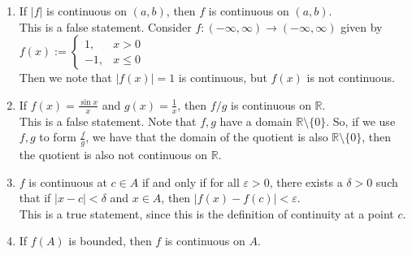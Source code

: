 \documentclass[12pt,letterpaper]{article}
\newcommand{\R}{\mathbb{R}}
\theoremstyle{case}
\theoremstyle{definition}
\newtheorem*{theorem*}{Theorem}
\begin{document}
\begin{enumerate}
\begin{enumerate}
\begin{theorem*}
\begin{enumerate}
						\item If $h:A \rightarrow \R$ is continuous at $c \in A$ and if $h(x) \neq 0$ for all $x \in A$, then the quotient $f/h$ is continuous at $c$.
					\end{enumerate}
				\end{theorem*}
			
				Thus, if we let $g=(f+g)-f$, we have that $g$ is also continuous by \textit{Theorem 5.2.1}.\\
				\item If $|f|$ is continuous on $(a,b)$, then $f$ is continuous on $(a,b)$.\\
				
				This is a false statement. Consider $f:(-\infty, \infty) \to (-\infty, \infty)$ given by $f(x):=\begin{cases}
					1, & x > 0 \\
					-1, & x \leq 0
				\end{cases}$\\
				Then we note that $|f(x)|=1$ is continuous, but $f(x)$ is not continuous.\\ 
				\item If $f(x)=\frac{\sin x}{x}$ and $g(x)=\frac{1}{x}$, then $f/g$ is continuous on $\R$.\\
				
				This is a false statement. Note that $f,g$ have a domain $\R \setminus \{0\}$. So, if we use $f,g$ to form $\frac{f}{g}$, we have that the domain of the quotient is also $\R \setminus \{0\}$, then the quotient is also not continuous on $\R$.\\
				\item $f$ is continuous at $c \in A$ if and only if for all $\varepsilon > 0$, there exists a $\delta >0$ such that if $|x-c|<\delta$ and $x \in A$, then $|f(x)-f(c)|<\varepsilon$.\\
				
				This is a true statement, since this is the definition of continuity at a point $c$.\\
				\item If $f(A)$ is bounded, then $f$ is continuous on $A$.\\
				

\end{enumerate}
\end{enumerate}
\end{document}
